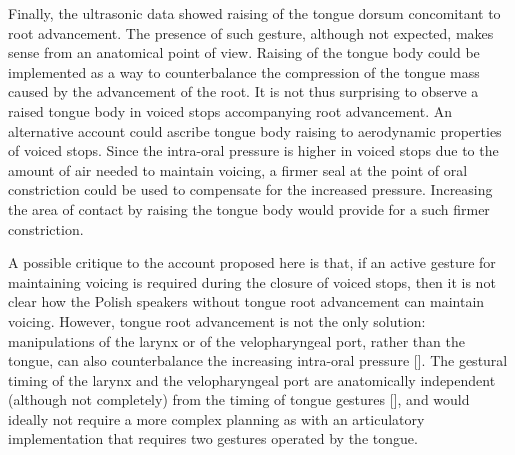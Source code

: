 \documentclass[authoryear, twocolumn]{elsarticle}
\begin{document}
Finally, the ultrasonic data showed raising of the tongue dorsum
concomitant to root advancement. The presence of such gesture, although
not expected, makes sense from an anatomical point of view. Raising of
the tongue body could be implemented as a way to counterbalance the
compression of the tongue mass caused by the advancement of the root. It
is not thus surprising to observe a raised tongue body in voiced stops
accompanying root advancement. An alternative account could ascribe
tongue body raising to aerodynamic properties of voiced stops. Since the
intra-oral pressure is higher in voiced stops due to the amount of air
needed to maintain voicing, a firmer seal at the point of oral
constriction could be used to compensate for the increased pressure.
Increasing the area of contact by raising the tongue body would provide
for a such firmer constriction.

A possible critique to the account proposed here is that, if an active
gesture for maintaining voicing is required during the closure of voiced
stops, then it is not clear how the Polish speakers without tongue root
advancement can maintain voicing. However, tongue root advancement is
not the only solution: manipulations of the larynx or of the
velopharyngeal port, rather than the tongue, can also counterbalance the
increasing intra-oral pressure {[}{]}. The gestural timing of the larynx
and the velopharyngeal port are anatomically independent (although not
completely) from the timing of tongue gestures {[}{]}, and would ideally
not require a more complex planning as with an articulatory
implementation that requires two gestures operated by the tongue.


\end{document}
